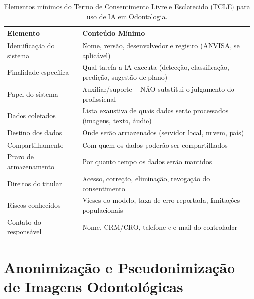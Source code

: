\begin{table}[H]
  \centering
  \caption{Elementos mínimos do Termo de Consentimento Livre e Esclarecido
  (TCLE) para uso de IA em Odontologia.}
  \label{tab:elementos-tcle-ia}
  \begin{tabularx}{\textwidth}{lX}
    \toprule
    \textbf{Elemento} & \textbf{Conteúdo Mínimo} \\
    \midrule
    Identificação do sistema & Nome, versão, desenvolvedor e registro
      (ANVISA, se aplicável) \\
    Finalidade específica & Qual tarefa a IA executa (detecção, classificação,
      predição, sugestão de plano) \\
    Papel do sistema & Auxiliar/suporte -- NÃO substitui o julgamento do
      profissional \\
    Dados coletados & Lista exaustiva de quais dados serão processados
      (imagens, texto, áudio) \\
    Destino dos dados & Onde serão armazenados (servidor local, nuvem, país) \\
    Compartilhamento & Com quem os dados poderão ser compartilhados \\
    Prazo de armazenamento & Por quanto tempo os dados serão mantidos \\
    Direitos do titular & Acesso, correção, eliminação, revogação do
      consentimento \\
    Riscos conhecidos & Vieses do modelo, taxa de erro reportada, limitações
      populacionais \\
    Contato do responsável & Nome, CRM/CRO, telefone e e-mail do controlador \\
    \bottomrule
  \end{tabularx}
\end{table}


\section{Anonimização e Pseudonimização de Imagens Odontológicas}
\label{sec:anonimizacao}

